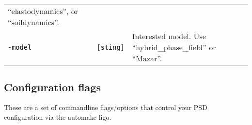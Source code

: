 \begin{longtable}[]{@{}lll@{}}
\begin{minipage}[t]{0.56\columnwidth}
``elastodynamics'', or ``soildynamics''.\strut
\end{minipage}\tabularnewline
\begin{minipage}[t]{0.26\columnwidth}\raggedright\strut
\lstinline!-model!\strut
\end{minipage} & \begin{minipage}[t]{0.09\columnwidth}\raggedright\strut
\lstinline![sting]!\strut
\end{minipage} & \begin{minipage}[t]{0.56\columnwidth}\raggedright\strut
Interested model. Use ``hybrid\_phase\_field'' or ``Mazar''.\strut
\end{minipage}\tabularnewline
\bottomrule
\end{longtable}

\subsection{Configuration flags}

These are a set of commandline flags/options that control your PSD
configuration via the automake ligo.

